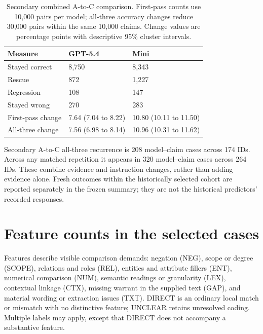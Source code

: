 \documentclass[11pt,letterpaper]{article}
\begin{document}
\begin{table}[htbp]\centering\small
\caption{Secondary combined A-to-C comparison. First-pass counts use 10,000 pairs per model; all-three accuracy changes reduce 30,000 pairs within the same 10,000 claims. Change values are percentage points with descriptive 95\% cluster intervals.}\label{tab:secondary}
\begin{tabularx}{\linewidth}{lXX}\toprule
Measure & GPT-5.4 & Mini \\\midrule
Stayed correct & 8,750 & 8,343 \\
Rescue & 872 & 1,227 \\
Regression & 108 & 147 \\
Stayed wrong & 270 & 283 \\
First-pass change & 7.64 (7.04 to 8.22) & 10.80 (10.11 to 11.50) \\
All-three change & 7.56 (6.98 to 8.14) & 10.96 (10.31 to 11.62) \\
\bottomrule
\end{tabularx}
\end{table}

Secondary A-to-C all-three recurrence is 208 model--claim cases across 174 IDs. Across any matched repetition it appears in 320 model--claim cases across 264 IDs. These combine evidence and instruction changes, rather than adding evidence alone. Fresh outcomes within the historically selected cohort are reported separately in the frozen summary; they are not the historical predictors' recorded responses.

\section{Feature counts in the selected cases}\label{app:taxonomy}
Features describe visible comparison demands: negation (NEG), scope or degree (SCOPE), relations and roles (REL), entities and attribute fillers (ENT), numerical comparison (NUM), semantic readings or granularity (LEX), contextual linkage (CTX), missing warrant in the supplied text (GAP), and material wording or extraction issues (TXT). DIRECT is an ordinary local match or mismatch with no distinctive feature; UNCLEAR retains unresolved coding. Multiple labels may apply, except that DIRECT does not accompany a substantive feature.
\end{document}
